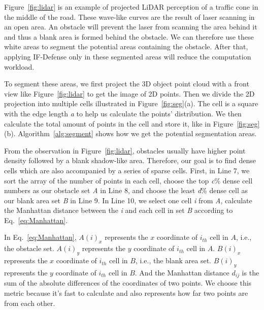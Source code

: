 Figure~\ref{fig:lidar} is an example of projected LiDAR perception of a traffic cone in the middle of the road. 
These wave-like curves are the result of laser scanning in an open area.
An obstacle will prevent the laser from scanning the area behind it and thus a blank area is formed behind the obstacle.
We can therefore use these white areas to segment the potential areas containing the obstacle.
After that, applying IF-Defense\cite{if-defense} only in these segmented areas will reduce the computation workload.

To segment these areas, we first project the 3D object point cloud with a front view like Figure~\ref{fig:lidar} to get the image of 2D points.
Then we divide the 2D projection into multiple cells illustrated in Figure~\ref{fig:seg}(a).
The cell is a square with the edge length \emph{a} to help us calculate the points' distribution. %
We then calculate the total amount of points in the cell and store it, like in Figure~\ref{fig:seg}(b).
Algorithm~\ref{alg:segment} shows how we get the potential segmentation areas.


From the observation in Figure~\ref{fig:lidar}, obstacles usually have higher point density followed by a blank shadow-like area. 
Therefore, our goal is to find dense cells which are also accompanied by a series of sparse cells.
First, in Line 7, we sort the array of the number of points in each cell, choose the top \emph{c}\% dense cell numbers as our obstacle set \emph{A} in Line 8, and choose the least \emph{d}\% dense cell as our blank area set \emph{B} in Line 9.
In Line 10, we select one cell \emph{i} from \emph{A}, calculate the Manhattan distance between the \emph{i} and each cell in set \emph{B} according to Eq.~\ref{eq:Manhattan}.

In Eq.~\ref{eq:Manhattan}, $A(i)_x$ represents the $x$ coordinate of $i_{th}$ cell in $A$, i.e., the obstacle set.
 $A(i)_y$ represents the $y$ coordinate of $i_{th}$ cell in $A$.
 $B(i)_x$ represents the $x$ coordinate of $i_{th}$ cell in $B$, i.e., the blank area set.
 $B(i)_y$ represents the $y$ coordinate of $i_{th}$ cell in $B$.
 And the Manhattan distance $d_{ij}$ is the sum of the absolute differences of the coordinates of two points.
We choose this metric because it's fast to calculate and also represents how far two points are from each other. 

